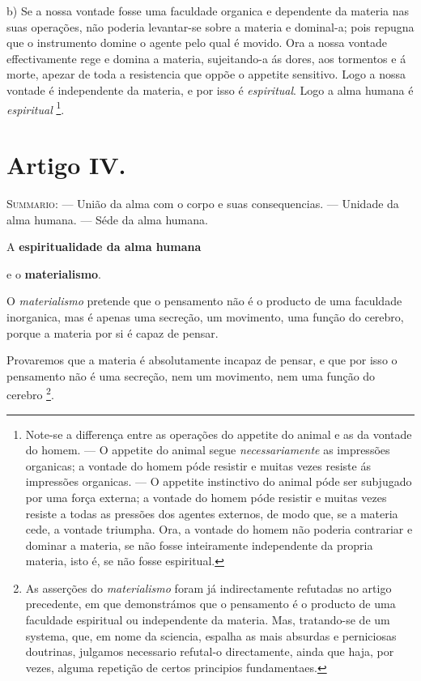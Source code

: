 b) Se a nossa vontade fosse uma faculdade organica e dependente da materia nas suas operações, não poderia levantar-se sobre a materia e dominal-a; pois repugna que o instrumento domine o agente pelo qual é movido. Ora a nossa vontade effectivamente rege e domina a materia, sujeitando-a ás dores, aos tormentos e á morte, apezar de toda a resistencia que oppõe o appetite sensitivo. Logo a nossa vontade é independente da materia, e por isso é \emph{espiritual}. Logo a alma humana é \emph{espiritual} \footnote{Note-se a differença entre as operações do appetite do animal e as da vontade do homem. --- O appetite do animal segue \emph{necessariamente} as impressões organicas; a vontade do homem póde resistir e muitas vezes resiste ás impressões organicas. --- O appetite instinctivo do animal póde ser subjugado por uma força externa; a vontade do homem póde resistir e muitas vezes resiste a todas as pressões dos agentes externos, de modo que, se a materia cede, a vontade triumpha. Ora, a vontade do homem não poderia contrariar e dominar a materia, se não fosse inteiramente independente da propria materia, isto é, se não fosse espiritual.}.


\section*{Artigo IV.}

{\small\noindent\textsc{Summario}: --- União da alma com o corpo e suas consequencias. --- Unidade da alma humana. --- Séde da alma humana.\par}

 A \textbf{espiritualidade da alma humana}

e o \textbf{materialismo}.


O \emph{materialismo} pretende que o pensamento não é o producto de uma faculdade inorganica, mas é apenas uma secreção, um movimento, uma função do cerebro, porque a materia por si é capaz de pensar.

Provaremos que a materia é absolutamente incapaz de pensar, e que por isso o pensamento não é uma secreção, nem um movimento, nem uma função do cerebro \footnote{As asserções do \emph{materialismo} foram já indirectamente refutadas no artigo precedente, em que demonstrámos que o pensamento é o producto de uma faculdade espiritual ou independente da materia. Mas, tratando-se de um systema, que, em nome da sciencia, espalha as mais absurdas e perniciosas doutrinas, julgamos necessario refutal-o directamente, ainda que haja, por vezes, alguma repetição de certos principios fundamentaes.}.

